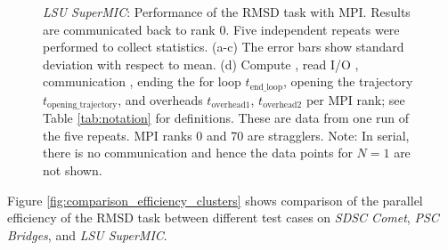 \begin{figure}[!htb]
\begin{subfigure} {.5\textwidth}
    \label{fig:MPIranks-SuperMIC}
  \end{subfigure}
  \caption{\emph{LSU SuperMIC}: Performance of the RMSD task with MPI.
    Results are communicated back to rank 0.
    Five independent repeats were performed to collect statistics.
    (a-c) The error bars show standard deviation with respect to mean.
    (d) Compute \tcomp, read I/O \tIO, communication \tcomm, ending the for loop $t_{\text{end\_loop}}$,  opening the trajectory $t_{\text{opening\_trajectory}}$, and overheads $t_{\text{overhead1}}$, $t_{\text{overhead2}}$ per MPI rank; see Table \ref{tab:notation} for definitions.
    These are data from one run of the five repeats.
    MPI ranks 0 and 70 are stragglers.
    Note: In serial, there is no communication and hence the data points for $N=1$ are not shown.}
  \label{fig:MPIwithIO-SuperMIC}
\end{figure} 


Figure \ref{fig:comparison_efficiency_clusters} shows comparison of the parallel efficiency of the RMSD task between different test cases on \emph{SDSC Comet}, \emph{PSC Bridges}, and \emph{LSU SuperMIC}.  

